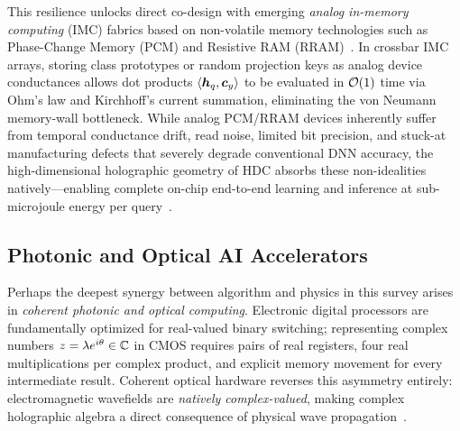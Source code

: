 This resilience unlocks direct co-design with emerging \emph{analog in-memory computing} (IMC) fabrics based on non-volatile memory technologies such as Phase-Change Memory (PCM) and Resistive RAM (RRAM)~\cite{KARUNARATNE_2020_PCM_HDC}.
In crossbar IMC arrays, storing class prototypes or random projection keys as analog device conductances allows dot products $\left\langle \boldsymbol{h}_q, \boldsymbol{c}_y \right\rangle$ to be evaluated in $\mathcal{O}\!\left(1\right)$ time via Ohm's law and Kirchhoff's current summation, eliminating the von Neumann memory-wall bottleneck.
While analog PCM/RRAM devices inherently suffer from temporal conductance drift, read noise, limited bit precision, and stuck-at manufacturing defects that severely degrade conventional DNN accuracy, the high-dimensional holographic geometry of HDC absorbs these non-idealities natively---enabling complete on-chip end-to-end learning and inference at sub-microjoule energy per query~\cite{KARUNARATNE_2020_PCM_HDC}.

\subsection{Photonic and Optical AI Accelerators}\label{sec:applications:photonics}

Perhaps the deepest synergy between algorithm and physics in this survey arises in \emph{coherent photonic and optical computing}.
Electronic digital processors are fundamentally optimized for real-valued binary switching; representing complex numbers $z = \lambda e^{i\theta} \in \mathbb{C}$ in CMOS requires pairs of real registers, four real multiplications per complex product, and explicit memory movement for every intermediate result.
Coherent optical hardware reverses this asymmetry entirely: electromagnetic wavefields are \emph{natively complex-valued}, making complex holographic algebra a direct consequence of physical wave propagation~\cite{WETZSTEIN_2020_OPTICAL_AI,MCMAHON_2023_PHYSICS_OPTICAL_NN}.

